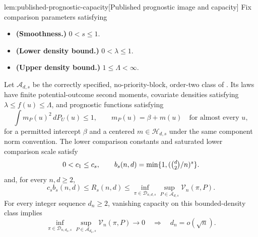 \documentclass[11pt]{article}
\begin{document}
\begin{lemmav}{lem:published-prognostic-capacity}[Published prognostic image and capacity]
Fix comparison parameters satisfying
\begin{itemize}
\item \textbf{(Smoothness.)} \(0<s\leq1\).
\item \textbf{(Lower density bound.)} \(0<\lambda\leq1\).
\item \textbf{(Upper density bound.)} \(1\leq\Lambda<\infty\).
\end{itemize}
Let \(\mathcal A_{d,s}\) be the correctly specified, no-priority-block, order-two class of \citet[Theorem B.8(ii)]{Cytrynbaum2026Limits}. Its laws have finite potential-outcome second moments, covariate densities satisfying \(\lambda\leq f(u)\leq\Lambda\), and prognostic functions satisfying
\[
\int m_P(u)^2\,dP_U(u)\leq1,
\qquad
m_P(u)=\beta+m(u)\quad\text{for almost every }u,
\]
for a permitted intercept \(\beta\) and a centered \(m\in\mathcal H_{d,s}\) under the same component norm convention. The lower comparison constants and saturated lower comparison scale satisfy
\[
0<c_1\leq c_s,
\qquad
b_s(n,d)=\min\{1,(\tbinom d2/n)^s\}.
\]
and, for every \(n,d\geq2\),
\[
c_s b_s(n,d)
\leq R_s(n,d)
\leq
\inf_{\pi\in\mathcal D_{n,d,s}}
\sup_{P\in\mathcal A_{d,s}}\mathcal V_n(\pi,P).
\]
For every integer sequence \(d_n\geq2\), vanishing capacity on this bounded-density class implies
\[
\inf_{\pi\in\mathcal D_{n,d_n,s}}
\sup_{P\in\mathcal A_{d_n,s}}\mathcal V_n(\pi,P)
\longrightarrow0
\quad\Longrightarrow\quad
d_n=o(\sqrt n).
\]
\end{lemmav}
\end{document}
